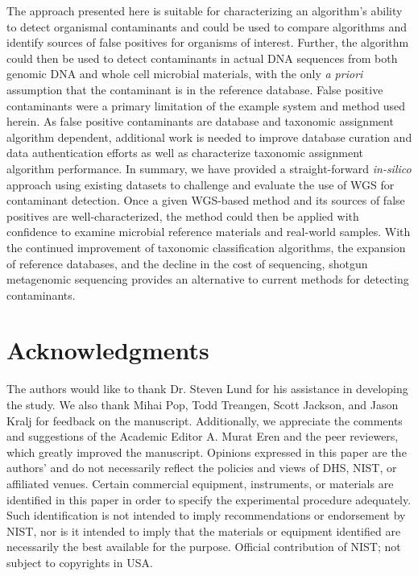 \documentclass[fleqn,10pt,lineno]{wlpeerj}\usepackage[]{graphicx}\usepackage[]{color}
\begin{document}
The approach presented here is suitable for characterizing an algorithm’s ability to detect organismal contaminants and could be used to compare algorithms and identify sources of false positives for organisms of interest.  Further, the algorithm could then be used to detect contaminants in actual DNA sequences from both genomic DNA and whole cell microbial materials, with the only \textit{a priori} assumption that the contaminant is in the reference database. 
False positive contaminants were a primary limitation of the example system and method used herein. 
As false positive contaminants are database and taxonomic assignment algorithm dependent, additional work is needed to improve database curation and data authentication efforts as well as characterize taxonomic assignment algorithm performance. 
In summary, we have provided a straight-forward \textit{in-silico} approach using existing datasets to challenge and evaluate the use of WGS for contaminant detection. 
Once a given WGS-based method and its sources of false positives are well-characterized, the method could then be applied with confidence to examine microbial reference materials and real-world samples. 
With the continued improvement of taxonomic classification algorithms, the expansion of reference databases, and the decline in the cost of sequencing, shotgun metagenomic sequencing provides an alternative to current methods for detecting contaminants.


\section*{Acknowledgments}

The authors would like to thank Dr. Steven Lund for his assistance in developing the study. 
We also thank Mihai Pop, Todd Treangen, Scott Jackson, and Jason Kralj for feedback on the manuscript. 
Additionally, we appreciate the comments and suggestions of the Academic Editor A. Murat Eren and the peer reviewers, which greatly improved the manuscript.
Opinions expressed in this paper are the authors’ and do not necessarily reflect the policies and views of DHS,  NIST, or affiliated venues.
Certain commercial equipment, instruments, or materials are identified in this paper in order to specify the experimental procedure adequately.
Such identification is not intended to imply recommendations or endorsement by NIST,
nor is it intended to imply that the materials or equipment identified are necessarily the best available for the purpose.
Official contribution of NIST; not subject to copyrights in USA.


\end{document}
